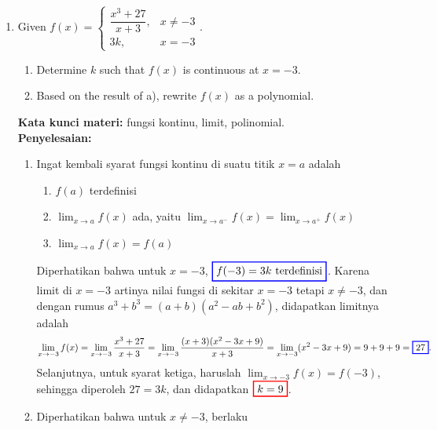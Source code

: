 \documentclass[10pt,openany,a4paper]{article}
\theoremstyle{definition}
\theoremstyle{definition}
\theoremstyle{plain}
\newenvironment{jawab}[2][tes]{%
\par\noindent\textbf{Kata kunci materi:} #1.\\
\textbf{Penyelesaian:} #2%
}{}
\begin{document}
\begin{enumerate}
    \item Given $f(x)=\begin{cases}
        \dfrac{x^3+27}{x+3}, & x\neq -3\\
        3k, & x=-3
    \end{cases}$.
    \begin{enumerate}
        \item[a.] Determine $k$ such that $f(x)$ is continuous at $x=-3$.
        \item[b.] Based on the result of a), rewrite $f(x)$ as a polynomial.
    \end{enumerate}
    \begin{jawab}[fungsi kontinu, limit, polinomial]{
        \begin{enumerate}
            \item Ingat kembali syarat fungsi kontinu di suatu titik \(x = a\) adalah
            \begin{enumerate}
                \item \(f(a)\) terdefinisi
                \item \(\displaystyle \lim_{x \to a} f(x)\) ada, yaitu $\displaystyle \lim_{x \to a^-} f(x) = \lim_{x \to a^+} f(x)$
                \item \(\displaystyle\lim_{x \to a} f(x) = f(a)\)
            \end{enumerate}
            Diperhatikan bahwa untuk \(x = -3\), $\colorlet{oldcolor}{.}
        \color{blue}
        \setlength{\fboxrule}{1pt} \boxed{\color{oldcolor}f(-3) = 3k~\text{terdefinisi}}\color{oldcolor}$. Karena limit di $x=-3$ artinya nilai fungsi di sekitar $x=-3$ tetapi $x\neq -3$, dan dengan rumus $a^3+b^3=(a+b)(a^2-ab+b^2)$, didapatkan limitnya adalah
            \begin{align*}
            \lim_{x \to -3} f(x) = \lim_{x \to -3} \frac{x^3 + 27}{x + 3} = \lim_{x \to -3} \frac{(x+3)(x^2 - 3x + 9)}{x+3} = \lim_{x \to -3} (x^2 - 3x + 9) = 9+9+9 = \colorlet{oldcolor}{.}
        \color{blue}
        \setlength{\fboxrule}{1pt} \boxed{\color{oldcolor}27}\color{oldcolor}.
            \end{align*}
            Selanjutnya, untuk syarat ketiga, haruslah $\displaystyle\lim_{x \to -3} f(x) = f(-3)$, sehingga diperoleh $27 = 3k$, dan didapatkan $\colorlet{oldcolor}{.}
        \color{red}
        \setlength{\fboxrule}{1pt} \boxed{\color{oldcolor}k=9}\color{oldcolor}$.
        \item Diperhatikan bahwa untuk $x\neq -3$, berlaku
        \begin{align*}

\end{align*}
\end{enumerate}}
\end{jawab}
\end{enumerate}
\end{document}
